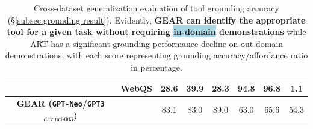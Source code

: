 \documentclass[11pt]{article}
\newcommand\Bstrut{\rule[-0.9ex]{0pt}{0pt}}   %
\newcommand{\name}{{\fontfamily{cmss}\selectfont GEAR}}
\newcommand{\gptDavinciThree}{{\tt \textcolor{darkredTwo}{GPT3$_{\text{davinci-003}}$}}}
\newcommand{\gptNeo}{{\tt \textcolor{darkblueTwo}{GPT-Neo}}}
\begin{document}
\begin{table}[t]
\begin{tabular}{cccccccc}
\multicolumn{1}{c}{}                     & \multicolumn{1}{c}{WebQS}                                                                &    \cellcolor{lightred}28.6                      & \cellcolor{lightred}39.9                     & \cellcolor{lightred}28.3                     & \cellcolor{lightblue}94.8                     & \cellcolor{lightblue}96.8                     & \cellcolor{lightblue}1.1                     \Bstrut  \\ \midrule
\multicolumn{1}{c}{\textbf{\name{} (\gptNeo/\gptDavinciThree)} }                   & \multicolumn{1}{c}{}    & 83.1 & 83.0 & 89.0 & 63.0 & 65.6 & 54.3 \\ \bottomrule
\end{tabular}
\caption{Cross-dataset generalization evaluation of tool grounding accuracy (\S\ref{subsec:grounding result}). Evidently,  \textbf{\name{} can identify the appropriate tool for a given task without requiring \colorbox{lightblue}{in-domain} demonstrations} while ART has a significant grounding performance decline on \colorbox{lightred}{out-domain} demonstrations, with each score representing grounding accuracy/affordance ratio in percentage.}
\label{table:generalization test}
\end{table}
\end{document}

